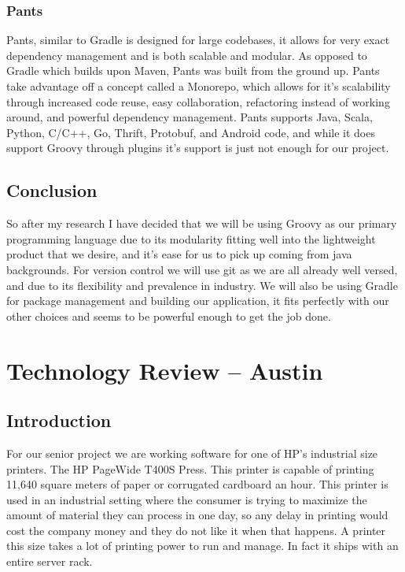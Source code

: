 \documentclass[onecolumn, draftclsnofoot,10pt, compsoc]{IEEEtran}
\begin{document}
\subsubsection{Pants}
Pants, similar to Gradle is designed for large codebases, it allows for very exact dependency management and is both scalable and modular. As opposed to Gradle which builds upon Maven, Pants was built from the ground up. Pants take advantage off a concept called a Monorepo, which allows for it's scalability through increased code reuse, easy collaboration, refactoring instead of working around, and powerful dependency management. Pants supports Java, Scala, Python, C/C++, Go, Thrift, Protobuf, and Android code, and while it does support Groovy through plugins it's support is just not enough for our project.
\subsection{Conclusion}
So after my research I have decided that we will be using Groovy as our primary programming language due to its modularity fitting well into the lightweight product that we desire, and it's ease for us to pick up coming from java backgrounds. For version control we will use git as we are all already well versed, and due to its flexibility and prevalence in industry. We will also be using Gradle for package management and building our application, it fits perfectly with our other choices and seems to be powerful enough to get the job done.

\newpage

\section{Technology Review -- Austin}

\subsection{Introduction}
For our senior project we are working software for one of HP’s industrial size printers. The HP PageWide T400S Press. This printer is capable of printing 11,640 square meters of paper or corrugated cardboard an hour. This printer is used in an industrial setting where the consumer is trying to maximize the amount of material they can process in one day, so any delay in printing would cost the company money and they do not like it when that happens. A printer this size takes a lot of printing power to run and manage. In fact it ships with an entire server rack. 
\end{document}

